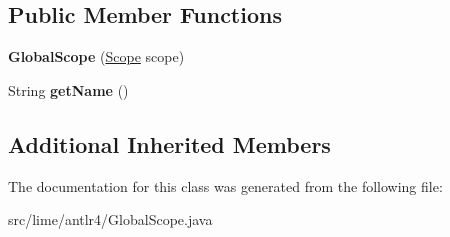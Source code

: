 \subsection*{Public Member Functions}
\begin{DoxyCompactItemize}
\item 
\mbox{\label{classlime_1_1antlr4_1_1GlobalScope_a045a91f24ac98ca4cd10b5d8d146cbd3}} 
{\bfseries Global\+Scope} (\hyperlink{interfacelime_1_1antlr4_1_1Scope}{Scope} scope)
\item 
\mbox{\label{classlime_1_1antlr4_1_1GlobalScope_a7499c2c0f470fabdf41ffb2228d0c606}} 
String {\bfseries get\+Name} ()
\end{DoxyCompactItemize}
\subsection*{Additional Inherited Members}


The documentation for this class was generated from the following file\+:\begin{DoxyCompactItemize}
\item 
src/lime/antlr4/Global\+Scope.\+java\end{DoxyCompactItemize}
